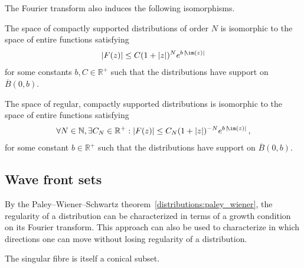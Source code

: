     The Fourier transform also induces the following isomorphisms.
    \begin{theorem}\label{distributions:paley_wiener}
        The space of compactly supported distributions of order $N$ is isomorphic to the space of entire functions satisfying
        \begin{gather}
            |F(z)|\leq C(1+|z|)^Ne^{b\,|\!\im(z)|}
        \end{gather}
        for some constants $b,C\in\mathbb{R}^+$ such that the distributions have support on $\overline{B}(0,b)$.

        The space of regular, compactly supported distributions is isomorphic to the space of entire functions satisfying
        \begin{gather}
            \forall N\in\mathbb{N},\exists C_N\in\mathbb{R}^+:|F(z)|\leq C_N(1+|z|)^{-N}e^{b\,|\!\im(z)|}\,,
        \end{gather}
        for some constant $b\in\mathbb{R}^+$ such that the distributions have support on $\overline{B}(0,b)$.
    \end{theorem}

\subsection{Wave front sets}

    By the Paley--Wiener--Schwartz theorem~\ref{distributions:paley_wiener}, the regularity of a distribution can be characterized in terms of a growth condition on its Fourier transform. This approach can also be used to characterize in which directions one can move without losing regularity of a distribution.

    \begin{property}
        The singular fibre is itself a conical subset.
    \end{property}

